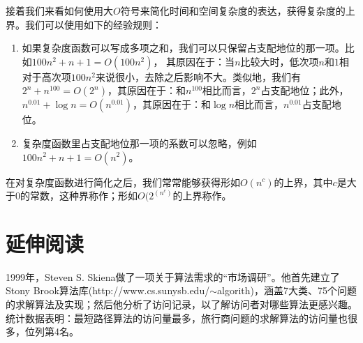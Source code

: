 	接着我们来看如何使用大$O$符号来简化时间和空间复杂度的表达，获得复杂度的上界。我们可以使用如下的经验规则：
	\begin{enumerate}[(1)]
		\item 如果复杂度函数可以写成多项之和，我们可以只保留占支配地位的那一项。比如$ 100 n^2 + n + 1 = O(100 n^2)$， 其原因在于：当$n$比较大时，低次项$n$和$1$相对于高次项$100n^2$来说很小，去除之后影响不大。类似地，我们有$2^n + n^{100} = O(2^n)$，其原因在于：和$n^{100}$相比而言，$2^n$占支配地位；此外，$n^{0.01} + \log n = O(n^{0.01})$，其原因在于：和$ \log n$相比而言，$n^{0.01}$占支配地位。
		\item 复杂度函数里占支配地位那一项的系数可以忽略，例如$ 100 n^2 + n + 1 = O( n^2)$。
	\end{enumerate}	
	在对复杂度函数进行简化之后，我们常常能够获得形如$O(n^c)$的上界，其中$c$是大于0的常数，这种界称作；形如$O(2^{(n^c)}$的上界称作。

\section*{延伸阅读}
1999年，Steven S. Skiena做了一项关于算法需求的“市场调研”\cite{Skiena1999}。他首先建立了Stony Brook算法库(http://www.cs.sunysb.edu/$\sim$algorith)，涵盖7大类、75个问题的求解算法及实现；然后他分析了访问记录，以了解访问者对哪些算法更感兴趣。统计数据表明：最短路径算法的访问量最多，旅行商问题的求解算法的访问量也很多，位列第4名。
	
	
	
